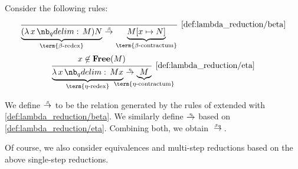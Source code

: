 \begin{definition}\label{def:beta_eta_reduction}
  Consider the following rules:
  \begin{TwoColumns}
    \begin{equation*}\taglabel[\ensuremath{ \logic{Red}_\beta }]{def:beta_eta_reduction/beta}
      \begin{prooftree}
        \infer0[\ref{def:lambda_reduction/beta}]{ \underbrace{(\qabs x M) N}_{\T{\term{\( \beta \)-redex}}} \bred \underbrace{M[x \mapsto N]}_{\T{\term{\( \beta \)-contractum}}} }.
      \end{prooftree}
    \end{equation*}
  \BeginSecondColumn
    \begin{equation*}\taglabel[\ensuremath{ \logic{Red}_\eta }]{def:beta_eta_reduction/eta}
      \begin{prooftree}
        \hypo{ x \not\in \op*{Free}(M) }
        \infer1[\ref{def:lambda_reduction/eta}]{ \underbrace{\qabs x M x}_{\T{\term{\( \eta \)-redex}}} \ered \underbrace{M}_{\mathclap{\T{\term{\( \eta \)-contractum}}}} }.
      \end{prooftree}
    \end{equation*}
  \end{TwoColumns}

  We define  \( {\bred} \) to be the relation generated by the rules of  extended with \ref{def:lambda_reduction/beta}. We similarly define  \( {\ered} \) based on \ref{def:lambda_reduction/eta}. Combining both, we obtain  \( {\bered} \).
\end{definition}
\begin{comments}
  \item Of course, we also consider equivalences and multi-step reductions based on the above single-step reductions.
\end{comments}

